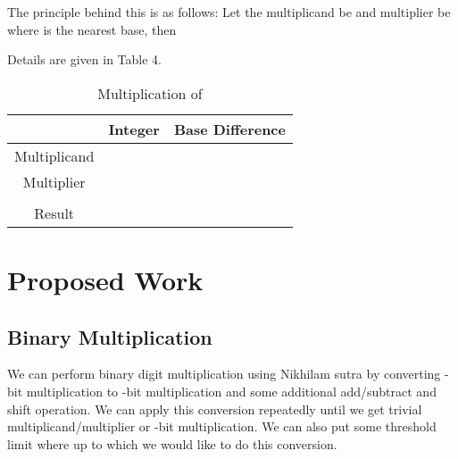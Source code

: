 \documentclass[conference]{IEEEtran}
\begin{document}
The principle behind this is as follows: 
Let the multiplicand be  and multiplier be  where  is the nearest base, then 

Details are given in Table 4.

\begin{table}[ht]
\renewcommand{\arraystretch}{1.3}
\caption{Multiplication of }
\label{table 4}
\begin{center}
\begin{tabular}{|c| c| c| } 
\hline
 & Integer & Base Difference    \\ [1ex] \hline\hline 
Multiplicand &  &    \\ \hline
Multiplier &  &   \\ \hline
 &  &   \\ \hline
Result &  &   \\ [1ex] \hline

\end{tabular} 
\end{center}
\end{table} 


\section{Proposed Work}
\subsection{Binary Multiplication}
We can perform binary digit multiplication using Nikhilam sutra by converting -bit multiplication to -bit multiplication and some additional add/subtract and shift operation. We can apply this conversion repeatedly until we get trivial multiplicand/multiplier or -bit multiplication. We can also put some threshold limit  where  up to which we would like to do this conversion.\\
\end{document}
